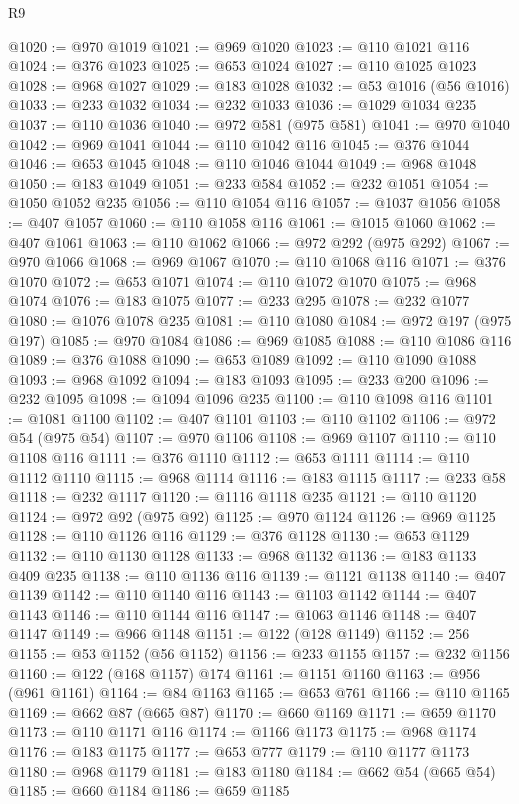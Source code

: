 \begin{lexlean}{R9}
\begin{coremodule}
@1020 := @970 @1019
@1021 := @969 @1020
@1023 := @110 @1021 @116
@1024 := @376 @1023
@1025 := @653 @1024
@1027 := @110 @1025 @1023
@1028 := @968 @1027
@1029 := @183 @1028
@1032 := @53 @1016 (@56 @1016)
@1033 := @233 @1032
@1034 := @232 @1033
@1036 := @1029 @1034 @235
@1037 := @110 @1036
@1040 := @972 @581 (@975 @581)
@1041 := @970 @1040
@1042 := @969 @1041
@1044 := @110 @1042 @116
@1045 := @376 @1044
@1046 := @653 @1045
@1048 := @110 @1046 @1044
@1049 := @968 @1048
@1050 := @183 @1049
@1051 := @233 @584
@1052 := @232 @1051
@1054 := @1050 @1052 @235
@1056 := @110 @1054 @116
@1057 := @1037 @1056
@1058 := @407 @1057
@1060 := @110 @1058 @116
@1061 := @1015 @1060
@1062 := @407 @1061
@1063 := @110 @1062
@1066 := @972 @292 (@975 @292)
@1067 := @970 @1066
@1068 := @969 @1067
@1070 := @110 @1068 @116
@1071 := @376 @1070
@1072 := @653 @1071
@1074 := @110 @1072 @1070
@1075 := @968 @1074
@1076 := @183 @1075
@1077 := @233 @295
@1078 := @232 @1077
@1080 := @1076 @1078 @235
@1081 := @110 @1080
@1084 := @972 @197 (@975 @197)
@1085 := @970 @1084
@1086 := @969 @1085
@1088 := @110 @1086 @116
@1089 := @376 @1088
@1090 := @653 @1089
@1092 := @110 @1090 @1088
@1093 := @968 @1092
@1094 := @183 @1093
@1095 := @233 @200
@1096 := @232 @1095
@1098 := @1094 @1096 @235
@1100 := @110 @1098 @116
@1101 := @1081 @1100
@1102 := @407 @1101
@1103 := @110 @1102
@1106 := @972 @54 (@975 @54)
@1107 := @970 @1106
@1108 := @969 @1107
@1110 := @110 @1108 @116
@1111 := @376 @1110
@1112 := @653 @1111
@1114 := @110 @1112 @1110
@1115 := @968 @1114
@1116 := @183 @1115
@1117 := @233 @58
@1118 := @232 @1117
@1120 := @1116 @1118 @235
@1121 := @110 @1120
@1124 := @972 @92 (@975 @92)
@1125 := @970 @1124
@1126 := @969 @1125
@1128 := @110 @1126 @116
@1129 := @376 @1128
@1130 := @653 @1129
@1132 := @110 @1130 @1128
@1133 := @968 @1132
@1136 := @183 @1133 @409 @235
@1138 := @110 @1136 @116
@1139 := @1121 @1138
@1140 := @407 @1139
@1142 := @110 @1140 @116
@1143 := @1103 @1142
@1144 := @407 @1143
@1146 := @110 @1144 @116
@1147 := @1063 @1146
@1148 := @407 @1147
@1149 := @966 @1148
@1151 := @122 (@128 @1149)
@1152 := 256
@1155 := @53 @1152 (@56 @1152)
@1156 := @233 @1155
@1157 := @232 @1156
@1160 := @122 (@168 @1157) @174
@1161 := @1151 @1160
@1163 := @956 (@961 @1161)
@1164 := @84 @1163
@1165 := @653 @761
@1166 := @110 @1165
@1169 := @662 @87 (@665 @87)
@1170 := @660 @1169
@1171 := @659 @1170
@1173 := @110 @1171 @116
@1174 := @1166 @1173
@1175 := @968 @1174
@1176 := @183 @1175
@1177 := @653 @777
@1179 := @110 @1177 @1173
@1180 := @968 @1179
@1181 := @183 @1180
@1184 := @662 @54 (@665 @54)
@1185 := @660 @1184
@1186 := @659 @1185

\end{coremodule}
\end{lexlean}
